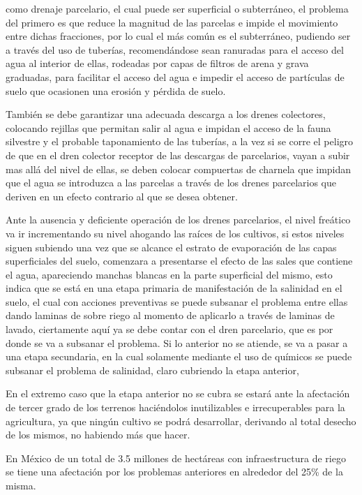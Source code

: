 como drenaje parcelario, el cual puede ser superficial o subterráneo, el problema del
primero es que reduce la magnitud de las parcelas e impide el movimiento entre dichas
fracciones, por lo cual el más común es el subterráneo, pudiendo ser a través del uso
de tuberías, recomendándose sean ranuradas para el acceso del agua al interior de
ellas, rodeadas por capas de filtros de arena y grava graduadas, para facilitar el acceso
del agua e impedir el acceso de partículas de suelo que ocasionen una erosión y
pérdida de suelo.

También se debe garantizar una adecuada descarga a los drenes colectores,
colocando rejillas que permitan salir al agua e impidan el acceso de la fauna silvestre y
el probable taponamiento de las tuberías, a la vez si se corre el peligro de que en el
dren colector receptor de las descargas de parcelarios, vayan a subir mas allá del nivel
de ellas, se deben colocar compuertas de charnela que impidan que el agua se
introduzca a las parcelas a través de los drenes parcelarios que deriven en un efecto
contrario al que se desea obtener.

Ante la ausencia y deficiente operación de los drenes parcelarios, el nivel freático
va ir incrementando su nivel ahogando las raíces de los cultivos, si estos niveles siguen
subiendo una vez que se alcance el estrato de evaporación de las capas superficiales
del suelo, comenzara a presentarse el efecto de las sales que contiene el agua,
apareciendo manchas blancas en la parte superficial del mismo, esto indica que se está
en una etapa primaria de manifestación de la salinidad en el suelo, el cual con acciones
preventivas se puede subsanar el problema entre ellas dando laminas de sobre riego al
momento de aplicarlo a través de laminas de lavado, ciertamente aquí ya se debe
contar con el dren parcelario, que es por donde se va a subsanar el problema.
Si lo anterior no se atiende, se va a pasar a una etapa secundaria, en la cual
solamente mediante el uso de químicos se puede subsanar el problema de salinidad,
claro cubriendo la etapa anterior,

En el extremo caso que la etapa anterior no se cubra se estará ante la afectación
de tercer grado de los terrenos haciéndolos inutilizables e irrecuperables para la
agricultura, ya que ningún cultivo se podrá desarrollar, derivando al total desecho de los
mismos, no habiendo más que hacer.

En México de un total de 3.5 millones de hectáreas con infraestructura de riego
se tiene una afectación por los problemas anteriores en alrededor del 25\% de la misma.

